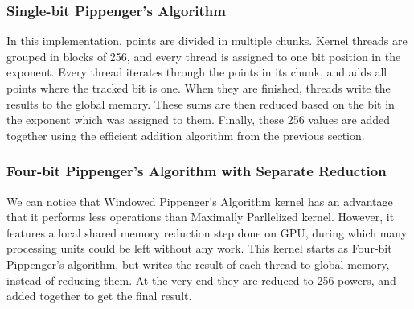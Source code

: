 \subsubsection{Single-bit Pippenger's Algorithm}
In this implementation, points are divided in multiple chunks. Kernel threads are grouped in blocks of 256, and every thread is assigned to one bit position in the exponent. Every thread iterates through the points in its chunk, and adds all points where the tracked bit is one. When they are finished, threads write the results to the global memory. These sums are then reduced based on the bit in the exponent which was assigned to them. Finally, these 256 values are added together using the efficient addition algorithm from the previous section.
\subsubsection{Four-bit Pippenger's Algorithm with Separate Reduction}
We can notice that Windowed Pippenger's Algorithm kernel has an advantage that it performs less operations than Maximally Parllelized kernel. However, it features a local shared memory reduction step done on GPU, during which many processing units could be left without any work. This kernel starts as Four-bit Pippenger's algorithm, but writes the result of each thread to global memory, instead of reducing them. At the very end they are reduced to 256 powers, and added together to get the final result.
